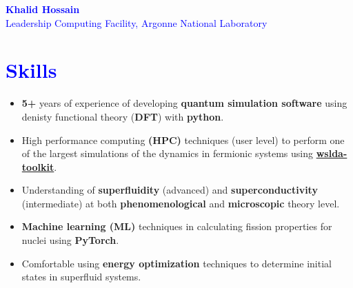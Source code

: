 \documentclass[10pt,fleqn]{scrartcl}
\begin{document}
\noindent
\textcolor{blue}{\LARGE{\textbf{Khalid Hossain}}} \\
\textcolor{blue}{\large{Leadership Computing Facility, Argonne National 
Laboratory}}
\noindent
\section*{\textcolor{blue}{Skills}}
\begin{itemize}
     \item \textbf{5+} years of experience of developing 
         \textbf{quantum simulation software} 
        using denisty functional theory (\textbf{DFT}) with 
        \textbf{python}.
    \item High performance computing \textbf{(HPC)} techniques (user level) to 
        perform one of the largest simulations of the dynamics in fermionic 
        systems using 
        \textcolor{blue}{\textbf{\href{https://gitlab.fizyka.pw.edu.pl/wtools/wslda}{wslda-toolkit}}}.
	\item Understanding of \textbf{superfluidity} (advanced) and 
        \textbf{superconductivity} (intermediate) at both 
        \textbf{phenomenological} and \textbf{microscopic} theory level.
    \item \textbf{Machine learning (ML)} techniques in calculating fission 
        properties for nuclei using \textbf{PyTorch}.
    \item Comfortable using \textbf{energy optimization} techniques to 
        determine initial states in superfluid systems. 
\end{itemize}

\noindent
\end{document}
